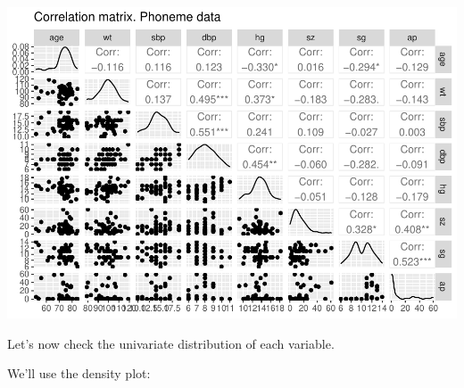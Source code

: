 \documentclass[
]{article}
\begin{document}
\includegraphics{clustering_files/figure-latex/unnamed-chunk-25-1.pdf}

Let's now check the univariate distribution of each variable.

We'll use the density plot:
\end{document}
